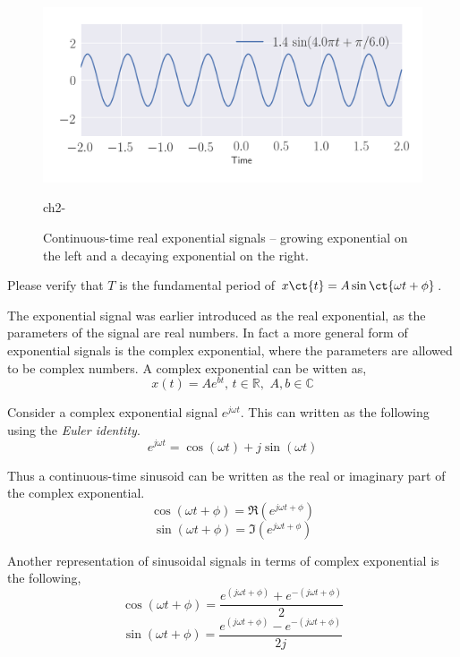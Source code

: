 \begin{figure}[h]
    \centering
    \includegraphics[width=\columnwidth]{figs/ch2-sine.png}
    \caption{Continuous-time real exponential signals -- growing exponential on the left and a decaying exponential on the right.} ch2-\label{fig:ch2_sine}
\end{figure}

\begin{problem*}[frametitle=Discrete-time exponential signals]
    Please verify that $T$ is the fundamental period of $x\ct{t} = A\sin\ct{\omega t + \phi}$.
\end{problem*}

The exponential signal was earlier introduced as the real exponential, as the parameters of the signal are real numbers. In fact a more general form of exponential signals is the complex exponential, where the parameters are allowed to be complex numbers. A complex exponential can be witten as,
\[ x\left(t\right) = Ae^{bt}, \, t \in \mathbb{R}, \,\, A, b \in \mathbb{C} \]

Consider a complex exponential signal $e^{j\omega t}$. This can written as the following using the \textit{Euler identity}.
\[ e^{j\omega t} = \cos\left(\omega t\right) + j\sin\left(\omega t\right) \]

Thus a continuous-time sinusoid can be written as the real or imaginary part of the complex exponential.
\[ \cos\left(\omega t + \phi\right) = \Re\left(e^{j\omega t + \phi}\right) \]
\[ \sin\left(\omega t + \phi\right) = \Im\left(e^{j\omega t + \phi}\right) \]

Another representation of sinusoidal signals in terms of complex exponential is the following,
\[ \cos\left(\omega t + \phi\right) = \frac{e^{\left(j\omega t + \phi\right)} + e^{-\left(j\omega t + \phi\right)}}{2} \]
\[ \sin\left(\omega t + \phi\right) = \frac{e^{\left(j\omega t + \phi\right)} - e^{-\left(j\omega t + \phi\right)}}{2j} \]

